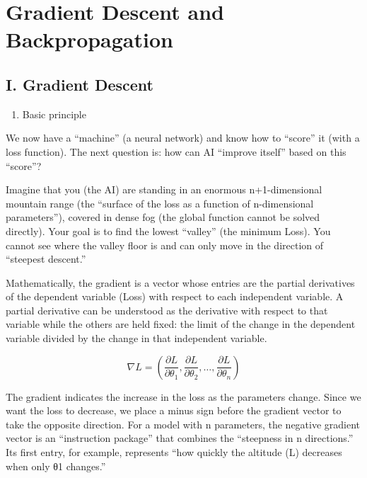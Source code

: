 \setcounter{section}{2}

\hypertarget{gradient-descent-and-backpropagation}{%
\section{Gradient Descent and Backpropagation}\label{gradient-descent-and-backpropagation}}

\hypertarget{i.-gradient-descent}{%
\subsection{I. Gradient Descent}\label{i.-gradient-descent}}

\begin{enumerate}
\def\labelenumi{\arabic{enumi}.}
\tightlist
\item
  Basic principle
\end{enumerate}

We now have a ``machine'' (a neural network) and know how to ``score'' it (with a loss function). The next question is: how can AI ``improve itself'' based on this ``score''?

Imagine that you (the AI) are standing in an enormous n+1-dimensional mountain range (the ``surface of the loss as a function of n-dimensional parameters''), covered in dense fog (the global function cannot be solved directly). Your goal is to find the lowest ``valley'' (the minimum Loss). You cannot see where the valley floor is and can only move in the direction of ``steepest descent.''

Mathematically, the gradient is a vector whose entries are the partial derivatives of the dependent variable (Loss) with respect to each independent variable. A partial derivative can be understood as the derivative with respect to that variable while the others are held fixed: the limit of the change in the dependent variable divided by the change in that independent variable.

\[
\nabla L = \left(\frac{\partial L}{\partial \theta_1}, \frac{\partial L}{\partial \theta_2}, \ldots, \frac{\partial L}{\partial \theta_n}\right)
\]

The gradient indicates the increase in the loss as the parameters change. Since we want the loss to decrease, we place a minus sign before the gradient vector to take the opposite direction. For a model with n parameters, the negative gradient vector is an ``instruction package'' that combines the ``steepness in n directions.'' Its first entry, for example, represents ``how quickly the altitude (L) decreases when only θ1 changes.''


